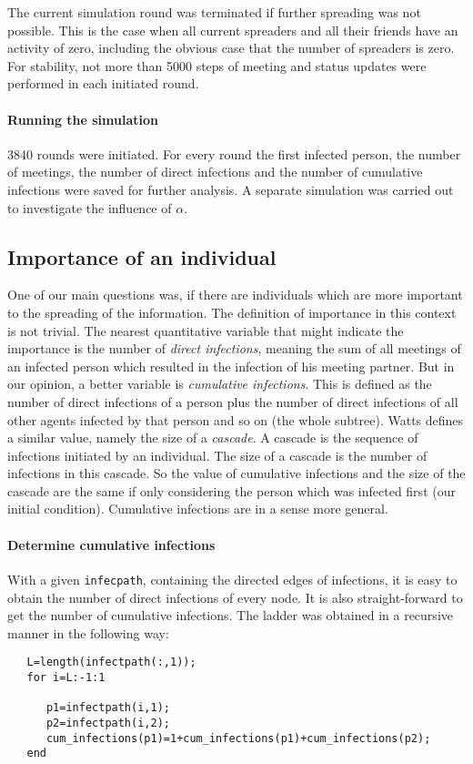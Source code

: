 The current simulation round was terminated if further spreading was not possible. This is the case when all current spreaders and all their friends have an activity of zero, including the obvious case that the number of spreaders is zero. For stability, not more than 5000 steps of meeting and status updates were performed in each initiated round.

\paragraph{Running the simulation}
3840 rounds were initiated. For every round the first infected person, the number of meetings, the number of direct infections and the number of cumulative infections were saved for further analysis. A separate simulation was carried out to investigate the influence of $\alpha$. 


\subsection{Importance of an individual}

One of our main questions was, if there are individuals which are more important to the spreading of the information. The definition of importance in this context is not trivial. The nearest quantitative variable that might indicate the importance is the number of \textit{direct infections}, meaning the sum of all meetings of an infected person which resulted in the infection of his meeting partner. But in our opinion, a better variable is \textit{cumulative infections}. This is defined as the number of direct infections of a person plus the number of direct infections of all other agents infected by that person and so on (the whole subtree). Watts \cite{influentials} defines a similar value, namely the size of a \textit{cascade}. A cascade is the sequence of infections initiated by an individual. The size of a cascade is the number of infections in this cascade. So the value of cumulative infections and the size of the cascade are the same if only considering the person which was infected first (our initial condition). Cumulative infections are in a sense more general. 

\paragraph{Determine cumulative infections}

With a given \texttt{infecpath}, containing the directed edges of infections, it is easy to obtain the number of direct infections of every node. It is also straight-forward to get the number of cumulative infections. The ladder was obtained in a recursive manner in the following way:

\begin{lstlisting} 
   L=length(infectpath(:,1));
   for i=L:-1:1
      
      p1=infectpath(i,1);
      p2=infectpath(i,2);
      cum_infections(p1)=1+cum_infections(p1)+cum_infections(p2);
   end

\end{lstlisting}

